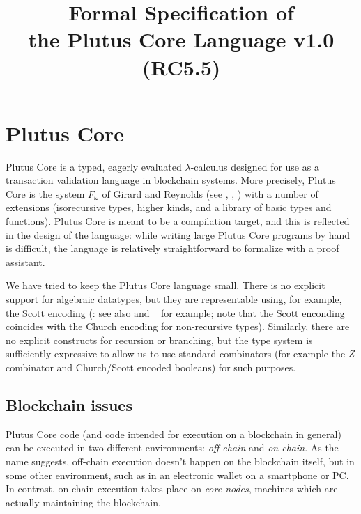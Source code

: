 \documentclass[a4paper]{article}
\begin{document}
%
\title{Formal Specification of\\the Plutus Core Language v1.0 (RC5.5)}


\maketitle

\thispagestyle{plain}
\pagestyle{plain}



\section{Plutus Core}

Plutus Core is a typed, eagerly evaluated $\lambda$-calculus designed
for use as a transaction validation language in blockchain
systems. More precisely, Plutus Core is the system $F_\omega$ of
Girard and Reynolds (see \cite{Girard-thesis},
\cite{Reynolds-type-structure}, \cite[\S30]{Pierce:TAPL}) with a
number of extensions (isorecursive types, higher kinds, and a library
of basic types and functions).  Plutus Core is meant to be a
compilation target, and this is reflected in the design of the
language: while writing large Plutus Core programs by hand is
difficult, the language is relatively straightforward to formalize
with a proof assistant.

We have tried to keep the Plutus Core language small. There is no
explicit support for algebraic datatypes, but they are representable
using, for example, the Scott encoding (\cite{Scott-encoding}: see
also \cite{Koopman:2014} and ~\cite{Geuvers-2014} for example; note that
the Scott enconding coincides with the Church encoding for
non-recursive types). Similarly, there are no explicit constructs for
recursion or branching, but the type system is sufficiently expressive
to allow us to use standard combinators (for example the $Z$
combinator and Church/Scott encoded booleans) for such purposes.


\subsection{Blockchain issues}
Plutus Core code (and code intended for execution on a blockchain in
general) can be executed in two different environments:
\textit{off-chain} and \textit{on-chain}.  As the name suggests,
off-chain execution doesn't happen on the blockchain itself, but in
some other environment, such as in an electronic wallet on a
smartphone or PC.  In contrast, on-chain execution takes place on
\textit{core nodes}, machines which are actually maintaining the
blockchain.
\end{document}

